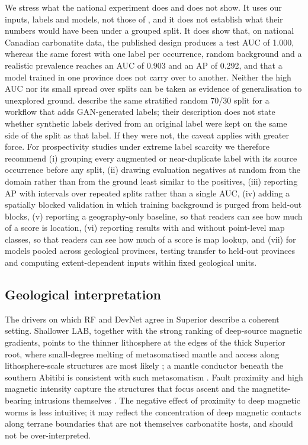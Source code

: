 \documentclass[pdflatex,sn-apa]{sn-jnl}
\begin{document}
We stress what the national experiment does and does not show. It uses our inputs, labels and models, not those of \citet{Parsa2024}, and it does not establish what their numbers would have been under a grouped split. It does show that, on national Canadian carbonatite data, the published design produces a test AUC of 1.000, whereas the same forest with one label per occurrence, random background and a realistic prevalence reaches an AUC of 0.903 and an AP of 0.292, and that a model trained in one province does not carry over to another. Neither the high AUC nor its small spread over splits can be taken as evidence of generalisation to unexplored ground. \citet{Parsa2025} describe the same stratified random 70/30 split for a workflow that adds GAN-generated labels; their description does not state whether synthetic labels derived from an original label were kept on the same side of the split as that label. If they were not, the caveat applies with greater force. For prospectivity studies under extreme label scarcity we therefore recommend (i) grouping every augmented or near-duplicate label with its source occurrence before any split, (ii) drawing evaluation negatives at random from the domain rather than from the ground least similar to the positives, (iii) reporting AP with intervals over repeated splits rather than a single AUC, (iv) adding a spatially blocked validation in which training background is purged from held-out blocks, (v) reporting a geography-only baseline, so that readers can see how much of a score is location, (vi) reporting results with and without point-level map classes, so that readers can see how much of a score is map lookup, and (vii) for models pooled across geological provinces, testing transfer to held-out provinces and computing extent-dependent inputs within fixed geological units.

\subsection{Geological interpretation}\label{sec:disc-geology}

The drivers on which RF and DevNet agree in Superior describe a coherent setting. Shallower LAB, together with the strong ranking of deep-source magnetic gradients, points to the thinner lithosphere at the edges of the thick Superior root, where small-degree melting of metasomatised mantle and access along lithosphere-scale structures are most likely \citep{Griffin2013,Groves2021,Hoggard2020}; a mantle conductor beneath the southern Abitibi is consistent with such metasomatism \citep{Snyder2021}. Fault proximity and high magnetic intensity capture the structures that focus ascent and the magnetite-bearing intrusions themselves \citep{Thomas2016}. The negative effect of proximity to deep magnetic worms is less intuitive; it may reflect the concentration of deep magnetic contacts along terrane boundaries that are not themselves carbonatite hosts, and should not be over-interpreted.
\end{document}
